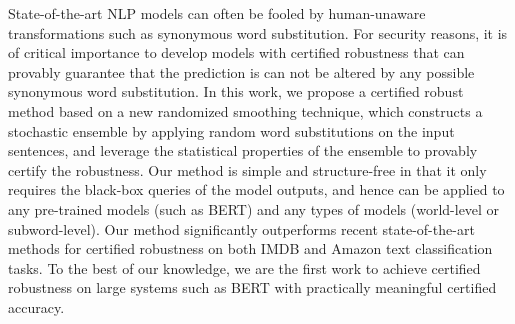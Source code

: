 State-of-the-art NLP models can often be fooled by human-unaware transformations such as synonymous word substitution. For security reasons, it is of critical importance to develop models  with certified robustness that can provably guarantee that the prediction is can not be altered by any possible synonymous word substitution.  In this work, we propose a certified robust method based on a new randomized smoothing technique, which constructs a stochastic ensemble by applying random word substitutions on the input sentences, and leverage the statistical properties of the ensemble to provably certify the robustness. Our method is simple and structure-free in that it only requires the black-box queries of the model outputs, and hence can be applied to any pre-trained models (such as BERT) and any types of models (world-level or subword-level). Our method significantly outperforms recent state-of-the-art methods for certified robustness on both IMDB and Amazon text classification tasks. To the best of our knowledge, we are the first work to achieve certified robustness on large systems such as BERT with practically meaningful certified accuracy.
